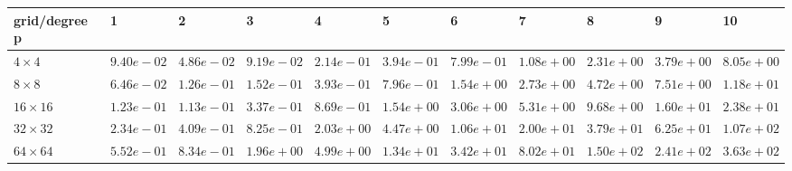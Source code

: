 \begin{tabular}{lllllllllll}
\hline
 grid/degree p   & 1          & 2          & 3          & 4          & 5          & 6          & 7          & 8          & 9          & 10         \\
\hline
 $4 \times 4$    & $9.40e-02$ & $4.86e-02$ & $9.19e-02$ & $2.14e-01$ & $3.94e-01$ & $7.99e-01$ & $1.08e+00$ & $2.31e+00$ & $3.79e+00$ & $8.05e+00$ \\
 $8 \times 8$    & $6.46e-02$ & $1.26e-01$ & $1.52e-01$ & $3.93e-01$ & $7.96e-01$ & $1.54e+00$ & $2.73e+00$ & $4.72e+00$ & $7.51e+00$ & $1.18e+01$ \\
 $16 \times 16$  & $1.23e-01$ & $1.13e-01$ & $3.37e-01$ & $8.69e-01$ & $1.54e+00$ & $3.06e+00$ & $5.31e+00$ & $9.68e+00$ & $1.60e+01$ & $2.38e+01$ \\
 $32 \times 32$  & $2.34e-01$ & $4.09e-01$ & $8.25e-01$ & $2.03e+00$ & $4.47e+00$ & $1.06e+01$ & $2.00e+01$ & $3.79e+01$ & $6.25e+01$ & $1.07e+02$ \\
 $64 \times 64$  & $5.52e-01$ & $8.34e-01$ & $1.96e+00$ & $4.99e+00$ & $1.34e+01$ & $3.42e+01$ & $8.02e+01$ & $1.50e+02$ & $2.41e+02$ & $3.63e+02$ \\
\hline
\end{tabular}